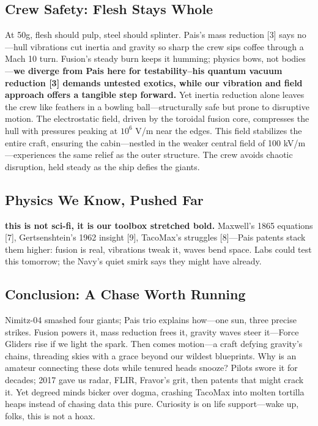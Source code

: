 \documentclass[11pt]{article}
\begin{document}
	\subsection{Crew Safety: Flesh Stays Whole}
	At 50g, flesh should pulp, steel should splinter. Pais’s mass reduction [3] says no—hull vibrations cut inertia and gravity so sharp the crew sips coffee through a Mach 10 turn. Fusion’s steady burn keeps it humming; physics bows, not bodies—\textbf{we diverge from Pais here for testability--his quantum vacuum reduction [3] demands untested exotics, while our vibration and field approach offers a tangible step forward.} Yet inertia reduction alone leaves the crew like feathers in a bowling ball—structurally safe but prone to disruptive motion. The electrostatic field, driven by the toroidal fusion core, compresses the hull with pressures peaking at \(10^6\) V/m near the edges. This field stabilizes the entire craft, ensuring the cabin—nestled in the weaker central field of 100 kV/m—experiences the same relief as the outer structure. The crew avoids chaotic disruption, held steady as the ship defies the giants.
	
	\subsection{Physics We Know, Pushed Far}
	\textbf{this is not sci-fi, it is our toolbox stretched bold.} Maxwell’s 1865 equations [7], Gertsenshtein’s 1962 insight [9], TacoMax’s struggles [8]—Pais patents stack them higher: fusion is real, vibrations tweak it, waves bend space. Labs could test this tomorrow; the Navy’s quiet smirk says they might have already.
	
	\subsection{Conclusion: A Chase Worth Running}
	Nimitz-04 smashed four giants; Pais trio explains how—one sun, three precise strikes. Fusion powers it, mass reduction frees it, gravity waves steer it—Force Gliders rise if we light the spark. Then comes motion—a craft defying gravity’s chains, threading skies with a grace beyond our wildest blueprints. Why is an amateur connecting these dots while tenured heads snooze? Pilots swore it for decades; 2017 gave us radar, FLIR, Fravor’s grit, then patents that might crack it. Yet degreed minds bicker over dogma, crashing TacoMax into molten tortilla heaps instead of chasing data this pure. Curiosity is on life support—wake up, folks, this is not a hoax.
	
\end{document}
